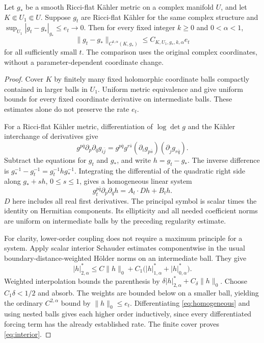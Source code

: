 \begin{lemma}\label{lem:interior}
Let $g_*$ be a smooth Ricci-flat K\"ahler metric on a complex manifold
$U$, and let $K\Subset U_1\Subset U$. Suppose $g_t$ are Ricci-flat
K\"ahler for the same complex structure and
$\sup_{U_1}|g_t-g_*|_{g_*}\le e_t\to0$. Then for every fixed
integer $k\ge0$ and $0<\alpha<1$,
\begin{equation}\label{eq:interior}
 \|g_t-g_*\|_{C^{k,\alpha}(K,g_*)}\le C_{K,U_1,g_*,k,\alpha}e_t
\end{equation}
for all sufficiently small $t$. The comparison uses the original
complex coordinates, without a parameter-dependent coordinate change.
\end{lemma}
\begin{proof}
Cover $K$ by finitely many fixed holomorphic coordinate balls compactly
contained in larger balls in $U_1$. Uniform metric equivalence and
\cite[Proposition~2.1]{hein_tosatti} give uniform bounds for every
fixed coordinate derivative on intermediate balls. These estimates
alone do not preserve the rate $e_t$.

For a Ricci-flat K\"ahler metric, differentiation of $\log\det g$
and the K\"ahler interchange of derivatives give
\begin{equation}\label{eq:RFsystem}
 g^{p\bar q}\partial_p\partial_{\bar q}g_{i\bar j}
 =g^{p\bar q}g^{r\bar s}
  (\partial_i g_{p\bar s})(\partial_{\bar j}g_{r\bar q}).
\end{equation}
Subtract the equations for $g_t$ and $g_*$, and write $h=g_t-g_*$.
The inverse difference is $g_*^{-1}-g_t^{-1}=g_t^{-1}hg_*^{-1}$.
Integrating the differential of the quadratic right side along
$g_*+sh$, $0\le s\le1$, gives a homogeneous linear system
\begin{equation}\label{eq:homogeneous}
 g_t^{p\bar q}\partial_p\partial_{\bar q}h
                      =A_t\cdot Dh+B_t h.
\end{equation}
$D$ here includes all real first derivatives. The principal symbol
is scalar times the identity on Hermitian components. Its ellipticity
and all needed coefficient norms are uniform on intermediate balls
by the preceding regularity estimate.

For clarity, lower-order coupling does not require a maximum
principle for a system. Apply scalar interior Schauder estimates
componentwise in the usual boundary-distance-weighted H\"older norms
on an intermediate ball. They give
\[
 |h|^*_{2,\alpha}\le C\|h\|_0+
 C_1\bigl(|h|^*_{1,\alpha}+|h|^*_{0,\alpha}\bigr).
\]
Weighted interpolation bounds the parenthesis by
$\delta |h|^*_{2,\alpha}+C_\delta\|h\|_0$.
Choose $C_1\delta<1/2$ and absorb. The weights are bounded below
on a smaller ball, yielding the ordinary $C^{2,\alpha}$ bound
by $\|h\|_0\le e_t$. Differentiating \eqref{eq:homogeneous}
and using nested balls gives each higher order inductively, since
every differentiated forcing term has the already established rate.
The finite cover proves \eqref{eq:interior}.
\end{proof}

